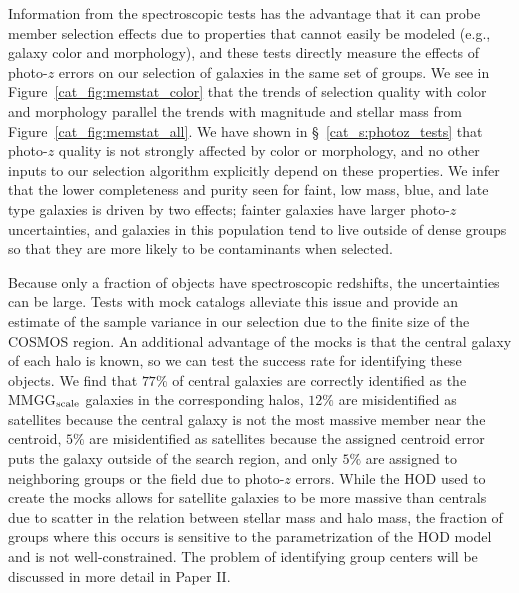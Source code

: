 Information from the spectroscopic tests has the advantage that it
can probe member selection effects due to properties that cannot easily be
modeled (e.g., galaxy color and morphology), and these tests directly
measure the effects of 
photo-$z$ errors on our selection of galaxies in the same set of
groups. We see in Figure~\ref{cat_fig:memstat_color} that the trends of
selection quality with color and morphology parallel the trends with
magnitude and stellar mass from Figure~\ref{cat_fig:memstat_all}. 
We have shown in \S~\ref{cat_s:photoz_tests} that photo-$z$ quality is
not strongly affected by color or morphology, and no other inputs
to our selection algorithm explicitly depend on these properties. We infer
that the lower completeness and purity seen for faint, low mass, blue, and
late type galaxies is driven by two effects; fainter galaxies have
larger photo-$z$ uncertainties, and galaxies in this population tend to live
outside of dense groups so that they are more likely to be
contaminants when selected.

Because only a fraction of objects have spectroscopic
redshifts, the uncertainties can be large. Tests with mock catalogs
alleviate this issue and provide an
estimate of the sample variance in our selection due to the finite
size of the COSMOS region. An additional advantage of the mocks is
that the central galaxy of  each halo is known, so we can test the
success rate for identifying these objects. We find that $77\%$ of
central galaxies are correctly identified as the MMGG$_{\rm scale}$
galaxies in the corresponding halos, $12\%$ are misidentified as
satellites because the central galaxy is not the most massive member
near the centroid, $5\%$ are misidentified as satellites because the
assigned centroid error puts the galaxy outside of the search region,
and only $5\%$ are assigned to neighboring groups or the field due to
photo-$z$ errors. While the HOD used to create the mocks allows for
satellite galaxies to be more massive than centrals due to scatter in
the relation between stellar mass and halo mass, the fraction of
groups where this occurs is sensitive to the parametrization of the
HOD model and is not well-constrained. The problem of identifying
group centers will be discussed in more detail in Paper II.

